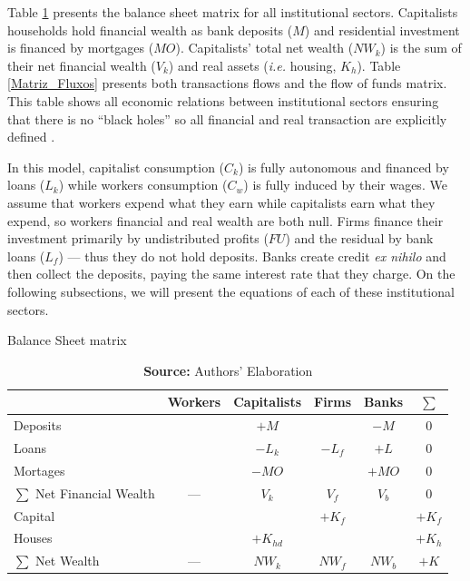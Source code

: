 \documentclass[11pt]{article}
\begin{document}
Table \ref{Matriz_Estoques} presents the balance sheet matrix for all institutional sectors. 
Capitalists households hold financial wealth as bank deposits (\(M\)) and residential investment is financed by mortgages (\(MO\)).
Capitalists' total net wealth (\(NW_{k}\)) is the sum of their net financial wealth (\(V_{k}\)) and real assets (\textit{i.e.} housing, \(K_h\)). 
Table  \ref{Matriz_Fluxos} presents both transactions flows and the flow of funds matrix. 
This table shows all economic relations between institutional sectors ensuring that there is no  ``black holes''
so all financial and real transaction are explicitly defined \cite{macedo_e_silva_peering_2011}.

In this model, capitalist consumption (\(C_k\)) is fully autonomous and financed by loans (\(L_{k}\)) while workers consumption (\(C_w\)) is fully induced by their wages.
We assume that workers expend what they earn while capitalists earn what they expend, so workers financial and real wealth are both null.
Firms finance their investment primarily by undistributed profits (\(FU\)) and the residual by bank loans (\(L_f\)) --- thus they do not hold deposits. 
Banks create credit \textit{ex nihilo} and then collect the deposits, paying the same interest rate that they charge.
On the following subsections, we will present the equations of each of these institutional sectors.



\begin{table}[H]
\centering
\caption{Balance Sheet matrix}
\label{Matriz_Estoques}
\begin{tabular}{lccccc}
\hline
\hline
                          & Workers & Capitalists      & Firms        & Banks  &    $\sum$ \\ \hline

Deposits & & $+M$ & & $-M$ & 0\\
Loans& &$-L_{k}$ &$-L_f$& $+L$ & 0\\
Mortages & &$-MO$&  & $+MO$ & 0\\\hline
$\sum$ Net Financial Wealth &--- &$V_{k}$&$V_f$&$V_b$& $0$\\\hline
Capital & & &$+K_f$&  & $+K_f$\\
Houses & &$+K_{hd}$& &   & $+K_h$\\\hline
$\sum$ Net Wealth &---&$NW_{k}$&$NW_f$&$NW_b$& $+K$\\
\hline
\hline
\end{tabular}%
\caption*{\textbf{Source:} Authors' Elaboration}
\end{table}
\end{document}

